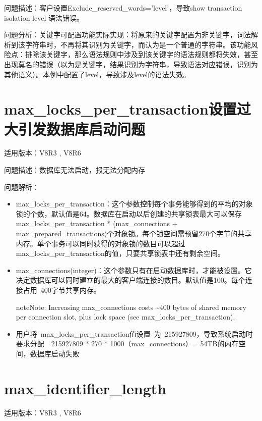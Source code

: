 \documentclass[a4,10pt,oneside,english]{sphinxmanual}
\begin{document}
问题描述：客户设置Exclude\_reserved\_words=’level’，导致show transaction isolation level 语法错误。

问题分析：关键字可配置功能实际实现：将原来的关键字配置为非关键字，词法解析到该字符串时，不再将其识别为关键字，而认为是一个普通的字符串。该功能风险点：排除该关键字，那么语法规则中涉及到该关键字的语法规则都将失效，甚至出现莫名的错误（以为是关键字，结果识别为字符串，导致语法对应错误，识别为其他语义）。本例中配置了level，导致涉及level的语法失效。


\section{max\_locks\_per\_transaction设置过大引发数据库启动问题}
\label{\detokenize{parameter:max-locks-per-transaction}}
适用版本：V8R3 , V8R6

问题描述：数据库无法启动，报无法分配内存

问题解析：
\begin{itemize}
\item {} 
max\_locks\_per\_transaction：这个参数控制每个事务能够得到的平均的对象锁的个数，默认值是64。数据库在启动以后创建的共享锁表最大可以保存max\_locks\_per\_transaction * (max\_connections + max\_prepared\_transactions)个对象锁。每个锁空间需预留270个字节的共享内存。单个事务可以同时获得的对象锁的数目可以超过max\_locks\_per\_transaction的值，只要共享锁表中还有剩余空间。

\item {} 
max\_connections(integer)：这个参数只有在启动数据库时，才能被设置。它决定数据库可以同时建立的最大的客户端连接的数目。默认值是100。每个连接占用 400字节共享内存。

\begin{sphinxadmonition}{note}{Note:}
Increasing max\_connections costs \textasciitilde{}400 bytes of shared memory per connection slot, plus lock space (see max\_locks\_per\_transaction).
\end{sphinxadmonition}

\item {} 
用户将 max\_locks\_per\_transaction值设置 为 215927809，导致系统启动时要求分配  215927809 * 270 * 1000（max\_connections）= 54TB的内存空间，数据库启动失败

\end{itemize}


\section{max\_identifier\_length}
\label{\detokenize{parameter:max-identifier-length}}
适用版本：V8R3 , V8R6
\end{document}

